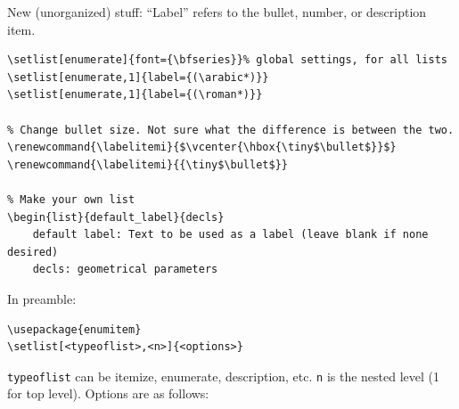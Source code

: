 \documentclass{article}
\renewcommand{\labelitemi}{$\vcenter{\hbox{\tiny$\bullet$}}$}
\begin{document}
New (unorganized) stuff:
``Label'' refers to the bullet, number, or description item.
\begin{verbatim}
\setlist[enumerate]{font={\bfseries}}% global settings, for all lists
\setlist[enumerate,1]{label={(\arabic*)}}
\setlist[enumerate,1]{label={(\roman*)}}

% Change bullet size. Not sure what the difference is between the two.
\renewcommand{\labelitemi}{$\vcenter{\hbox{\tiny$\bullet$}}$}
\renewcommand{\labelitemi}{{\tiny$\bullet$}}

% Make your own list
\begin{list}{default_label}{decls}
    default label: Text to be used as a label (leave blank if none desired)
    decls: geometrical parameters
\end{verbatim}

In preamble:
\begin{verbatim}
\usepackage{enumitem}
\setlist[<typeoflist>,<n>]{<options>}
\end{verbatim}
\verb|typeoflist| can be itemize, enumerate, description, etc.
\verb|n| is the nested level (1 for top level). Options are as follows:
\end{document}

